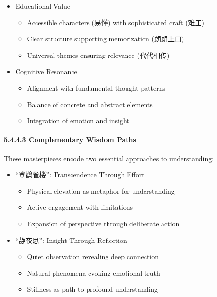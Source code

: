 \documentclass[11pt,letterpaper]{article}
\begin{document}
\begin{itemize}
\tightlist
\item
  Educational Value

  \begin{itemize}
  \tightlist
  \item
    Accessible characters (易懂) with sophisticated craft (难工)
  \item
    Clear structure supporting memorization (朗朗上口)
  \item
    Universal themes ensuring relevance (代代相传)
  \end{itemize}
\item
  Cognitive Resonance

  \begin{itemize}
  \tightlist
  \item
    Alignment with fundamental thought patterns
  \item
    Balance of concrete and abstract elements
  \item
    Integration of emotion and insight
  \end{itemize}
\end{itemize}

\paragraph{5.4.4.3 Complementary Wisdom
Paths}\label{complementary-wisdom-paths}

These masterpieces encode two essential approaches to understanding:

\begin{itemize}
\tightlist
\item
  ``登鹳雀楼'': Transcendence Through Effort

  \begin{itemize}
  \tightlist
  \item
    Physical elevation as metaphor for understanding
  \item
    Active engagement with limitations
  \item
    Expansion of perspective through deliberate action
  \end{itemize}
\item
  ``静夜思'': Insight Through Reflection

  \begin{itemize}
  \tightlist
  \item
    Quiet observation revealing deep connection
  \item
    Natural phenomena evoking emotional truth
  \item
    Stillness as path to profound understanding
  \end{itemize}
\end{itemize}
\end{document}
